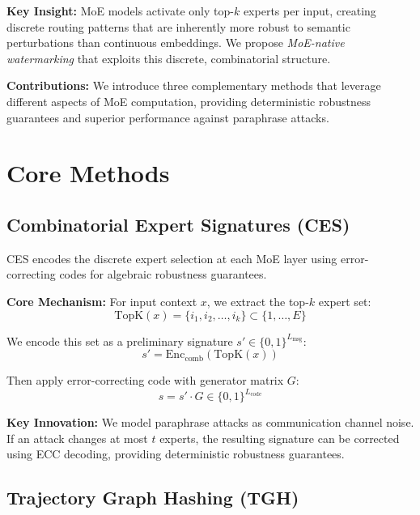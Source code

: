 \documentclass[letterpaper,twocolumn,10pt]{article}
\begin{document}
\textbf{Key Insight:} MoE models activate only top-$k$ experts per input, creating discrete routing patterns that are inherently more robust to semantic perturbations than continuous embeddings. We propose \textit{MoE-native watermarking} that exploits this discrete, combinatorial structure.

\textbf{Contributions:} We introduce three complementary methods that leverage different aspects of MoE computation, providing deterministic robustness guarantees and superior performance against paraphrase attacks.

\section{Core Methods}

\subsection{Combinatorial Expert Signatures (CES)}

CES encodes the discrete expert selection at each MoE layer using error-correcting codes for algebraic robustness guarantees.

\textbf{Core Mechanism:} For input context $x$, we extract the top-$k$ expert set:
\begin{equation}
\text{TopK}(x) = \{i_1, i_2, \ldots, i_k\} \subset \{1, \ldots, E\}
\end{equation}

We encode this set as a preliminary signature $s' \in \{0,1\}^{L_{\text{msg}}}$:
\begin{equation}
s' = \text{Enc}_{\text{comb}}(\text{TopK}(x))
\end{equation}

Then apply error-correcting code with generator matrix $G$:
\begin{equation}
s = s' \cdot G \in \{0,1\}^{L_{\text{code}}}
\end{equation}

\textbf{Key Innovation:} We model paraphrase attacks as communication channel noise. If an attack changes at most $t$ experts, the resulting signature can be corrected using ECC decoding, providing deterministic robustness guarantees.

\subsection{Trajectory Graph Hashing (TGH)}
\end{document}
